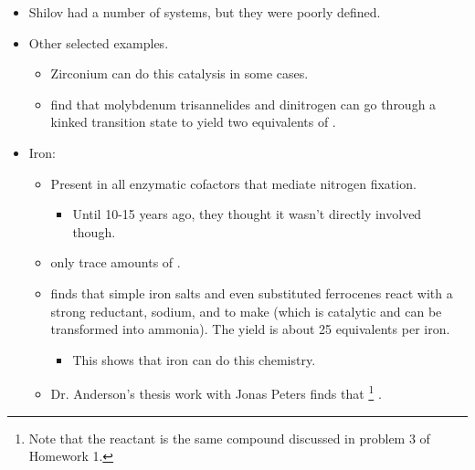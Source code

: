 \documentclass[../notes.tex]{subfiles}
\begin{document}
\begin{itemize}
\begin{itemize}
\begin{itemize}
        \end{itemize}
        \item To reiterate, this is the Chatt/Distal\footnote{Note that Chatt and Distal are interchangeable synonyms.} cycle they observed: .
        \begin{itemize}
            \item Note that molybdenum starts in the $3+$ oxidation state at  and goes up to $6+$ at  before cycling back down.
        \end{itemize}
    \end{itemize}
    \item Shilov had a number of systems, but they were poorly defined.
    \item Other selected examples.
    \begin{itemize}
        \item Zirconium can do this catalysis in some cases.
        \item \textcite{bib:CumminsLaplaza} find that molybdenum trisannelides and dinitrogen can go through a kinked transition state to yield two equivalents of .
    \end{itemize}
    \item Iron:
    \begin{itemize}
        \item Present in all enzymatic cofactors that mediate nitrogen fixation.
        \begin{itemize}
            \item Until 10-15 years ago, they thought it wasn't directly involved though.
        \end{itemize}
        \item {} only trace amounts of .
        \item \textcite{bib:NishibayashiIron} finds that simple iron salts and even substituted ferrocenes react with a strong reductant, sodium, and  to make  (which is catalytic and can be transformed into ammonia). The yield is about 25 equivalents per iron.
        \begin{itemize}
            \item This shows that iron can do this chemistry.
        \end{itemize}
        \item Dr. Anderson's thesis work with Jonas Peters finds that \footnote{Note that the reactant is the same compound discussed in problem 3 of Homework 1.} \parencite{bib:AndersonPeters}.

\end{itemize}
\end{itemize}
\end{document}
